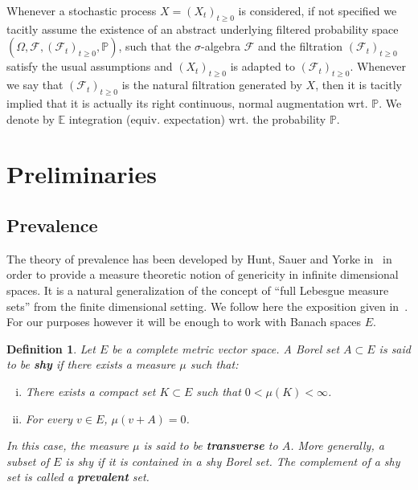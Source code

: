 \documentclass[11pt,oneside,reqno]{amsart}
\newcommand{\tmdfn}[1]{\textbf{#1}}
\newenvironment{enumerateroman}{\begin{enumerate}[i.] }{\end{enumerate}}
\newtheorem{definition}[theorem]{Definition}
\numberwithin{equation}{section}
\begin{document}
Whenever a stochastic process $X = (X_t)_{t \geqslant 0}$ is considered, if
not specified we tacitly assume the existence of an abstract underlying
filtered probability space $(\Omega, \mathcal{F}, (\mathcal{F}_t)_{t \geqslant
0}, \mathbb{P})$, such that the $\sigma$-algebra $\mathcal{F}$ and the
filtration $(\mathcal{F}_t)_{t \geqslant 0}$ satisfy the usual assumptions and
$(X_t)_{t \geqslant 0}$ is adapted to $(\mathcal{F}_t)_{t \geqslant 0}$.
Whenever we say that $(\mathcal{F}_t)_{t \geqslant 0}$ is the natural
filtration generated by $X$, then it is tacitly implied that it is actually
its right continuous, normal augmentation wrt. $\mathbb{P}$. We denote by
$\mathbb{E}$ integration (equiv. expectation) wrt. the probability
$\mathbb{P}$.

\section{Preliminaries}\label{sec:preliminaries}

\subsection{Prevalence}\label{sec:prevalence}

The theory of prevalence has been developed by Hunt, Sauer and Yorke
in~{\cite{huntsauer}} in order to provide a measure theoretic notion of
genericity in infinite dimensional spaces. It is a natural generalization of
the concept of ``full Lebesgue measure sets'' from the finite dimensional
setting. We follow here the exposition given in~{\cite{huntsauer}}. For our
purposes however it will be enough to work with Banach spaces $E$.

\begin{definition}
  \label{def:prevalence}Let $E$ be a complete metric vector space. A Borel set
  $A \subset E$ is said to be {\tmdfn{shy}} if there exists a measure $\mu$
  such that:
  \begin{enumerateroman}
    \item There exists a compact set $K \subset E$ such that $0 < \mu (K) <
    \infty$.
    
    \item For every $v \in E$, $\mu (v + A) = 0$.
  \end{enumerateroman}
  In this case, the measure $\mu$ is said to be {\tmdfn{transverse}} to $A$.
  More generally, a subset of $E$ is shy if it is contained in a shy Borel
  set. The complement of a shy set is called a {\tmdfn{prevalent}} set.
\end{definition}
\end{document}
